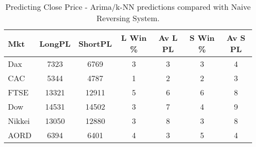 \begin{table}[ht]
\centering
\caption[Predicting Close Price - Arima/k-NN predictions passed to System 1.]{Predicting Close Price - Arima/k-NN predictions compared with Naive Reversing System.} 
\label{tab:chp_ts:pred_close_arima_knn_sys1_diff}
\begin{tabular}{lcccccc}
  \toprule Mkt & LongPL & ShortPL & L Win \% & Av L PL & S Win \% & Av S PL \\ 
  \midrule Dax & 7323 & 6769 & 3 & 3 & 3 & 4 \\ 
  CAC & 5344 & 4787 & 1 & 2 & 2 & 3 \\ 
  FTSE & 13321 & 12911 & 5 & 6 & 6 & 8 \\ 
  Dow & 14531 & 14502 & 3 & 7 & 4 & 9 \\ 
  Nikkei & 13050 & 12880 & 3 & 8 & 3 & 8 \\ 
  AORD & 6394 & 6401 & 4 & 3 & 5 & 4 \\ 
   \bottomrule \end{tabular}
\end{table}
